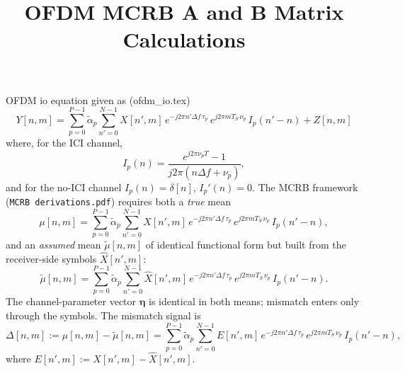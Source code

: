 \documentclass[11pt]{article}
\title{OFDM MCRB A and B Matrix Calculations}
\author{}
\date{}
\begin{document}
\maketitle
OFDM io equation given as (ofdm\_io.tex)
\begin{equation}
    Y[n,m]
= \sum_{p=0}^{P-1} \tilde{\alpha}_p
  \sum_{n'=0}^{N-1} X[n',m]\,
  e^{-j2\pi n'\Delta f\, \tau_p}\,
  e^{j2\pi mT_S\, \nu_p}\,
  I_p(n'-n) + Z[n,m]
\end{equation}
where, for the ICI channel,
\begin{equation}
    I_p(n)
 = \frac{e^{j2\pi \nu_p T} - 1}{j2\pi(n\Delta f + \nu_p)},
\end{equation}
and for the no-ICI channel \(I_p(n) = \delta[n]\), \(I_p'(n) = 0\). The MCRB framework (\texttt{MCRB derivations.pdf}) requires both a \emph{true} mean
\begin{equation}
    \mu[n,m]
= \sum_{p=0}^{P-1} \tilde{\alpha}_p
  \sum_{n'=0}^{N-1} X[n',m]\,
  e^{-j2\pi n'\Delta f\, \tau_p}\,
  e^{j2\pi mT_S\, \nu_p}\,
  I_p(n'-n),
\end{equation}
and an \emph{assumed} mean \(\tilde{\mu}[n,m]\) of identical functional form but built from the receiver-side symbols \(\hat{X}[n',m]\):
\begin{equation}
    \tilde{\mu}[n,m]
= \sum_{p=0}^{P-1} \tilde{\alpha}_p
  \sum_{n'=0}^{N-1} \hat{X}[n',m]\,
  e^{-j2\pi n'\Delta f\, \tau_p}\,
  e^{j2\pi mT_S\, \nu_p}\,
  I_p(n'-n).
\end{equation}
The channel-parameter vector \(\bm{\eta}\) is identical in both means; mismatch enters only through the symbols. The mismatch signal is
\begin{equation}
    \Delta[n,m] := \mu[n,m] - \tilde{\mu}[n,m]
    = \sum_{p=0}^{P-1} \tilde{\alpha}_p \sum_{n'=0}^{N-1} E[n',m]\, e^{-j2\pi n'\Delta f\, \tau_p}\, e^{j2\pi mT_S\, \nu_p}\, I_p(n'-n),
\end{equation}
where \(E[n',m] := X[n',m] - \hat{X}[n',m]\).
\end{document}
